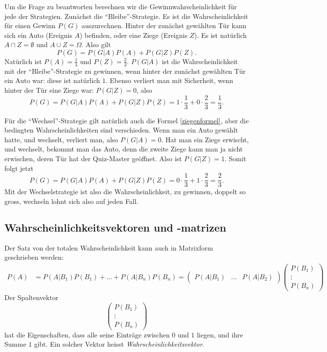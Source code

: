 Um die Frage zu beantworten berechnen wir die Gewinnwahrscheinlichkeit
für jede der Strategien.
Zunächst die ``Bleibe''-Strategie.
Es ist die
Wahrscheinlichkeit für einen Gewinn $P(G)$ auszurechnen.
Hinter der zunächst
gewählten Tür kann sich ein Auto (Ereignis $A$) befinden, oder eine Ziege
(Ereignis $Z$).
Es ist natürlich $A\cap Z=\emptyset$ und $A\cup Z=\Omega$.
Also gilt
\begin{equation}
P(G)=P(G|A) P(A) + P(G|Z)P(Z).
\label{ziegenformel}
\end{equation}
Natürlich ist $P(A)=\frac13$ und $P(Z)=\frac23$.
$P(G|A)$ ist die Wahrscheinlichkeit mit der ``Bleibe''-Strategie zu
gewinnen, wenn hinter der zunächst gewählten Tür ein Auto war: diese
ist natürlich $1$.
Ebenso verliert man mit Sicherheit, wenn hinter der
Tür eine Ziege war: $P(G|Z)=0$, also
\[
P(G)=P(G|A)P(A)+P(G|Z)P(Z)=1\cdot \frac13 + 0\cdot\frac 23=\frac13.
\]

Für die ``Wechsel''-Strategie gilt natürlich auch die Formel
\ref{ziegenformel}, aber die bedingten Wahrscheinlichkeiten sind verschieden.
Wenn man ein Auto gewählt hatte, und wechselt, verliert man, also $P(G|A)=0$.
Hat man ein Ziege erwischt, und wechselt, bekommt man das Auto, denn die
zweite Ziege kann man ja nicht erwischen, deren Tür hat der Quiz-Master
geöffnet.
Also ist $P(G|Z)=1$.
Somit folgt jetzt
\[
P(G)=P(G|A)P(A)+P(G|Z)P(Z)=0\cdot\frac13+1\cdot\frac23=\frac23.
\]
Mit der Wechselstrategie ist also die Wahrscheinlichkeit, zu gewinnen,
doppelt so gross, wechseln lohnt sich also auf jeden Fall.


\subsection{Wahrscheinlichkeitsvektoren und -matrizen}
Der Satz von der totalen Wahrscheinlichkeit kann auch in Matrixform
geschrieben werden:
\begin{align*}
P(A)&=P(A|B_1)P(B_1)+\dots+P(A|B_n)P(B_n)
=
\begin{pmatrix}
P(A|B_1)&\dots&P(A|B_2)
\end{pmatrix}
\begin{pmatrix}
P(B_1)\\\vdots\\P(B_n)
\end{pmatrix}
\end{align*}
Der Spaltenvektor
\[
\begin{pmatrix}
P(B_1)\\\vdots\\P(B_n)
\end{pmatrix}
\]
hat die Eigenschaften, dass alle seine Einträge zwischen $0$ und $1$
liegen, und ihre Summe $1$ gibt.
Ein solcher Vektor heisst {\it Wahrscheinlichkeitsvektor}.

